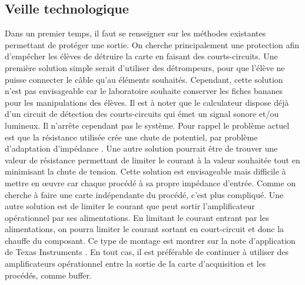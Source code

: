 \documentclass{report}
\begin{document}
\subsection{Veille technologique}
Dans un premier temps, il faut se renseigner sur les méthodes existantes permettant de protéger une sortie. On cherche principalement une protection afin d'empêcher les élèves de détruire la carte en faisant des courts-circuits. Une première solution simple serait d'utiliser des détrompeurs, pour que l'élève ne puisse connecter le câble qu'au éléments souhaités. Cependant, cette solution n'est pas envisageable car le laboratoire souhaite conserver les fiches bananes pour les manipulations des élèves.
Il est à noter que le calculateur dispose déjà d'un circuit de détection des courts-circuits qui émet un signal sonore et/ou lumineux. Il n'arrête cependant pas le système. Pour rappel le problème actuel est que la résistance utilisée crée une chute de potentiel, par problème d'adaptation d'impédance \cite{Gabriel2012}. Une autre solution pourrait être de trouver une valeur de résistance permettant de limiter le courant à la valeur souhaitée tout en minimisant la chute de tension. Cette solution est envisageable mais difficile à mettre en œuvre car chaque procédé à sa propre impédance d'entrée. Comme on cherche à faire une carte indépendante du procédé, c'est plus compliqué.
Une autre solution est de limiter le courant que peut sortir l'amplificateur opérationnel par ses alimentations. En limitant le courant entrant par les alimentations, on pourra limiter le courant sortant en court-circuit et donc la chauffe du composant. Ce type de montage est montrer sur la note d'application de Texas Instruments \cite{appnoteti}.
En tout cas, il est préférable de continuer à utiliser des amplificateurs opérationnel entre la sortie de la carte d'acquisition et les procédés, comme buffer.
\end{document}
